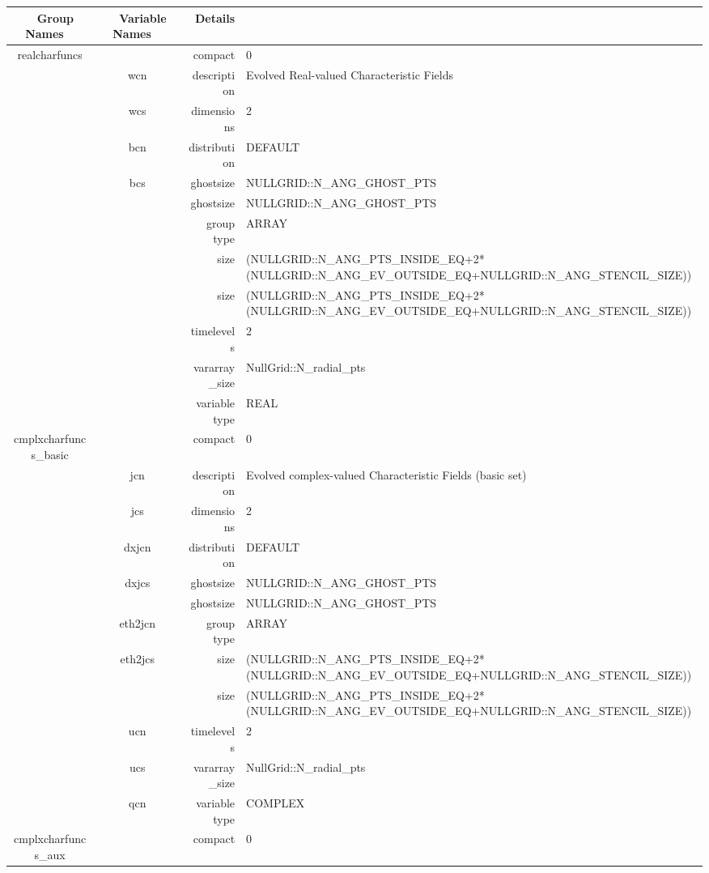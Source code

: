 \begin{tabular*}{150mm}{|c|c@{\extracolsep{\fill}}|rl|} \hline 
~ {\bf Group Names} ~ & ~ {\bf Variable Names} ~  &{\bf Details} ~ & ~\\ 
\hline 
realcharfuncs &  & compact & 0 \\ 
 & wcn & description & Evolved Real-valued Characteristic Fields \\ 
 & wcs & dimensions & 2 \\ 
 & bcn & distribution & DEFAULT \\ 
 & bcs & ghostsize & NULLGRID::N\_ANG\_GHOST\_PTS \\ 
& ~ & ghostsize & NULLGRID::N\_ANG\_GHOST\_PTS \\ 
 &  & group type & ARRAY \\ 
 &  & size & (NULLGRID::N\_ANG\_PTS\_INSIDE\_EQ+2*(NULLGRID::N\_ANG\_EV\_OUTSIDE\_EQ+NULLGRID::N\_ANG\_STENCIL\_SIZE)) \\ 
& ~ & size & (NULLGRID::N\_ANG\_PTS\_INSIDE\_EQ+2*(NULLGRID::N\_ANG\_EV\_OUTSIDE\_EQ+NULLGRID::N\_ANG\_STENCIL\_SIZE)) \\ 
 &  & timelevels & 2 \\ 
 &  & vararray\_size & NullGrid::N\_radial\_pts \\ 
 &  & variable type & REAL \\ 
\hline 
cmplxcharfuncs\_basic &  & compact & 0 \\ 
 & jcn & description & Evolved complex-valued Characteristic Fields (basic set) \\ 
 & jcs & dimensions & 2 \\ 
 & dxjcn & distribution & DEFAULT \\ 
 & dxjcs & ghostsize & NULLGRID::N\_ANG\_GHOST\_PTS \\ 
& ~ & ghostsize & NULLGRID::N\_ANG\_GHOST\_PTS \\ 
 & eth2jcn & group type & ARRAY \\ 
 & eth2jcs & size & (NULLGRID::N\_ANG\_PTS\_INSIDE\_EQ+2*(NULLGRID::N\_ANG\_EV\_OUTSIDE\_EQ+NULLGRID::N\_ANG\_STENCIL\_SIZE)) \\ 
& ~ & size & (NULLGRID::N\_ANG\_PTS\_INSIDE\_EQ+2*(NULLGRID::N\_ANG\_EV\_OUTSIDE\_EQ+NULLGRID::N\_ANG\_STENCIL\_SIZE)) \\ 
 & ucn & timelevels & 2 \\ 
 & ucs & vararray\_size & NullGrid::N\_radial\_pts \\ 
 & qcn & variable type & COMPLEX \\ 
\hline 
cmplxcharfuncs\_aux &  & compact & 0 \\ 

\end{tabular*}
